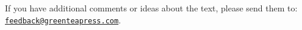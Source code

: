 If you have additional comments or ideas about the text, please send them to: \href{mailto:feedback@greenteapress.com}{\tt feedback@greenteapress.com}.
